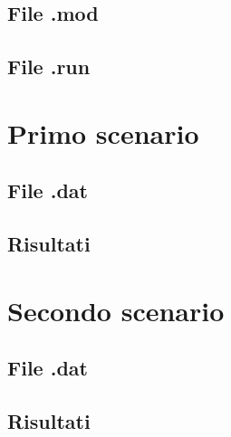 \documentclass[12pt]{article}
\begin{document}
    \subsection{File .mod}
    \subsection{File .run}
    \section{Primo scenario}
    \subsection{File .dat}
    \subsection{Risultati}
    \section{Secondo scenario}
    \subsection{File .dat}
    \subsection{Risultati}
\end{document}
